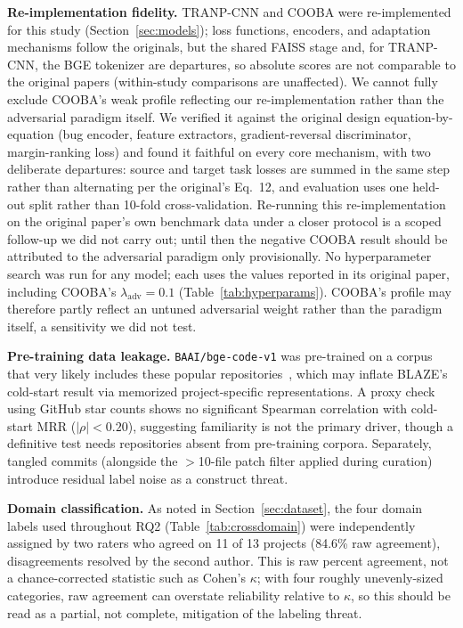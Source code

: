\documentclass[a4paper,fleqn]{cas-dc}
\begin{document}
\textbf{Re-implementation fidelity.}
TRANP-CNN and COOBA were re-implemented for this study
(Section~\ref{sec:models}); loss functions, encoders, and adaptation
mechanisms follow the originals, but the shared FAISS stage and, for
TRANP-CNN, the BGE tokenizer are departures, so absolute scores are not
comparable to the original papers (within-study comparisons are
unaffected). We cannot fully exclude COOBA's weak profile reflecting our
re-implementation rather than the adversarial paradigm itself. We verified
it against the original design equation-by-equation (bug encoder, feature
extractors, gradient-reversal discriminator, margin-ranking loss) and found
it faithful on every core mechanism, with two deliberate departures:
source and target task losses are summed in the
same step rather than alternating per the original's Eq.~12, and evaluation
uses one held-out split rather than 10-fold cross-validation. Re-running
this re-implementation on the original paper's own benchmark data under a
closer protocol is a scoped follow-up we did not carry out; until then the
negative COOBA result should be attributed to the adversarial paradigm only
provisionally. No hyperparameter search was run for any model; each uses
the values reported in its original paper, including COOBA's
$\lambda_\mathrm{adv} = 0.1$ (Table~\ref{tab:hyperparams}). COOBA's profile
may therefore partly reflect an untuned adversarial weight rather than the
paradigm itself, a sensitivity we did not test.

\textbf{Pre-training data leakage.}
\texttt{BAAI/bge-code-v1} was pre-trained on a corpus that very likely
includes these popular repositories~\citep{aleithan2024swebenchplus}, which
may inflate BLAZE's cold-start result via memorized project-specific
representations. A proxy check using GitHub star counts shows no significant
Spearman correlation with cold-start MRR ($|\rho| < 0.20$), suggesting
familiarity is not the primary driver, though a definitive test needs
repositories absent from pre-training corpora. Separately, tangled commits
(alongside the $>$10-file patch filter applied during curation) introduce
residual label noise as a construct threat.

\textbf{Domain classification.}
As noted in Section~\ref{sec:dataset}, the four domain labels used throughout
RQ2 (Table~\ref{tab:crossdomain}) were independently assigned by two raters
who agreed on 11 of 13 projects (84.6\% raw agreement), disagreements resolved by the second author.
This is raw percent agreement, not a chance-corrected statistic such as
Cohen's $\kappa$; with four roughly unevenly-sized categories, raw agreement
can overstate reliability relative to $\kappa$, so this should be read as a
partial, not complete, mitigation of the labeling threat.
\end{document}
